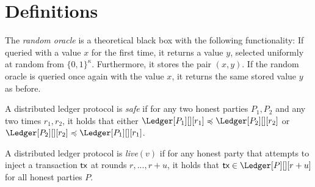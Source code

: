\section{Definitions}

\begin{definition}
  The \emph{random oracle} is a theoretical black box with the
  following functionality:
  If queried with a value $x$ for the first time, it returns a
  value $y$, selected uniformly at random from $\{0, 1\}^\kappa$.
  Furthermore, it stores the pair $(x, y)$. If the random oracle
  is queried once again with the value $x$, it returns the same
  stored value $y$ as before.
\end{definition}

\begin{definition}[Safety]
  A distributed ledger protocol is \emph{safe} if
  for any two honest parties $P_1, P_2$ and any two times $r_1, r_2$, it holds that either
  $\Ledger[P_1][][r_1] \preccurlyeq \Ledger[P_2][][r_2]$ or $\Ledger[P_2][][r_2] \preccurlyeq \Ledger[P_1][][r_1]$.
\end{definition}

\begin{definition}[Liveness]
  A distributed ledger protocol is \emph{live}$(v)$ if
  for any honest party that attempts to inject a transaction $\textsf{tx}$
  at rounds $r,...,r+u$, it holds that $\tx \in \Ledger[P][][r+u]$
  for all honest parties $P$.
\end{definition}


